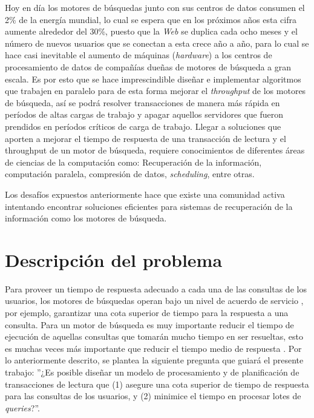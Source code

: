 Hoy en día los motores de búsquedas junto con sus centros de datos consumen el 2\% de la energía mundial, lo cual se espera que en los próximos años esta cifra aumente alrededor del 30\%, puesto que la \textit{Web} se duplica cada ocho meses y el número de nuevos usuarios que se conectan a esta crece año a año, para lo cual se hace casi inevitable el aumento de máquinas (\textit{hardware}) a los centros de procesamiento de datos de compañías dueñas de motores de búsqueda a gran escala. Es por esto que se hace imprescindible diseñar e implementar algoritmos que trabajen en paralelo para de esta forma mejorar el \textit{throughput} de los motores de búsqueda, así se podrá resolver transacciones de manera más rápida en períodos de altas cargas de trabajo y apagar aquellos servidores que fueron prendidos en períodos críticos de carga de trabajo. Llegar a soluciones que aporten a mejorar el tiempo de respuesta de una transacción de lectura y el throughput de un motor de búsqueda, requiere conocimientos de diferentes áreas de ciencias de la computación como: Recuperación de la información, computación paralela, compresión de datos, \textit{scheduling}, entre otras. 

Los desafíos expuestos anteriormente hace que existe una comunidad activa intentando encontrar soluciones eficientes para sistemas de recuperación de la información como los motores de búsqueda.  


\section{Descripci\'on del problema}
\label{intro:problema}
Para proveer un tiempo de respuesta adecuado a cada una de las consultas de los usuarios, los motores de búsquedas operan bajo un nivel de acuerdo de servicio \citep{Jeon:2014}, por ejemplo, garantizar una cota superior de tiempo para la respuesta a una consulta. Para un motor de búsqueda es muy importante reducir el tiempo de ejecución de aquellas consultas que tomarán mucho tiempo en ser resueltas, esto es muchas veces más importante que reducir el tiempo medio de respuesta \citep{Dean:2013}. Por lo anteriormente descrito, se plantea la siguiente pregunta que guiará el presente trabajo: ''¿Es posible diseñar un modelo de procesamiento y de planificación de transacciones de lectura que (1) asegure una cota superior de tiempo de respuesta para las consultas de los usuarios, y (2) minimice el tiempo en procesar lotes de \textit{queries}?''.  

